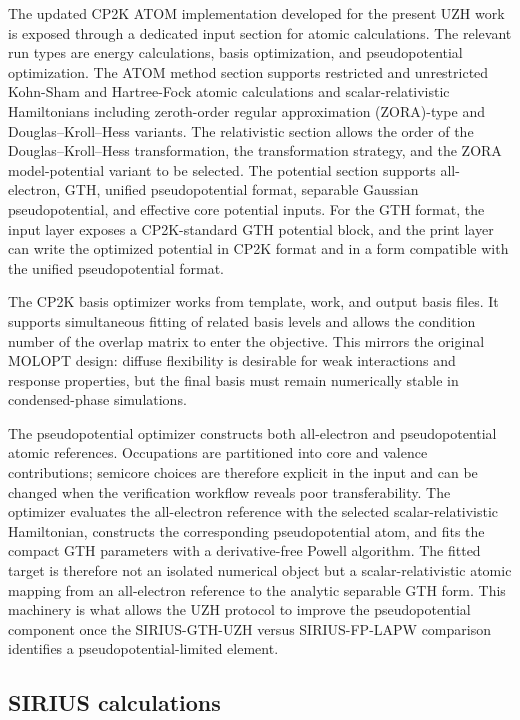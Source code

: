 \documentclass[aps,prb,preprint,amsmath,amssymb,superscriptaddress,longbibliography,floatfix]{revtex4-2}
\begin{document}
The updated CP2K ATOM implementation developed for the present UZH work is exposed through a dedicated input section for atomic calculations. The relevant run types are energy calculations, basis optimization, and pseudopotential optimization. The ATOM method section supports restricted and unrestricted Kohn-Sham and Hartree-Fock atomic calculations and scalar-relativistic Hamiltonians including zeroth-order regular approximation (ZORA)-type and Douglas--Kroll--Hess variants. The relativistic section allows the order of the Douglas--Kroll--Hess transformation, the transformation strategy, and the ZORA model-potential variant to be selected. The potential section supports all-electron, GTH, unified pseudopotential format, separable Gaussian pseudopotential, and effective core potential inputs. For the GTH format, the input layer exposes a CP2K-standard GTH potential block, and the print layer can write the optimized potential in CP2K format and in a form compatible with the unified pseudopotential format.

The CP2K basis optimizer works from template, work, and output basis files. It supports simultaneous fitting of related basis levels and allows the condition number of the overlap matrix to enter the objective. This mirrors the original MOLOPT design: diffuse flexibility is desirable for weak interactions and response properties, but the final basis must remain numerically stable in condensed-phase simulations.

The pseudopotential optimizer constructs both all-electron and pseudopotential atomic references. Occupations are partitioned into core and valence contributions; semicore choices are therefore explicit in the input and can be changed when the verification workflow reveals poor transferability. The optimizer evaluates the all-electron reference with the selected scalar-relativistic Hamiltonian, constructs the corresponding pseudopotential atom, and fits the compact GTH parameters with a derivative-free Powell algorithm. The fitted target is therefore not an isolated numerical object but a scalar-relativistic atomic mapping from an all-electron reference to the analytic separable GTH form. This machinery is what allows the UZH protocol to improve the pseudopotential component once the SIRIUS-GTH-UZH versus SIRIUS-FP-LAPW comparison identifies a pseudopotential-limited element.

\subsection{SIRIUS calculations}
\end{document}
